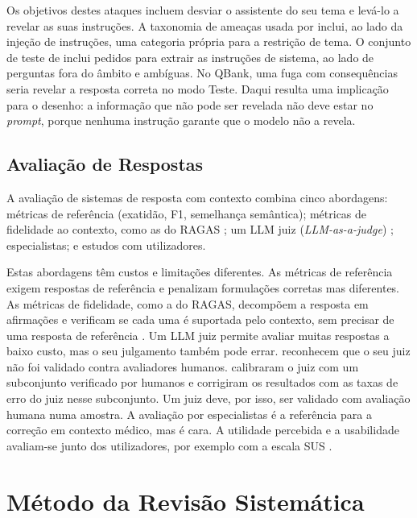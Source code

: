 Os objetivos destes ataques incluem desviar o assistente do seu tema e levá-lo a revelar as suas instruções. A taxonomia de ameaças usada por \textcite{walczak2026comparative} inclui, ao lado da injeção de instruções, uma categoria própria para a restrição de tema. O conjunto de teste de \textcite{buti2026evaluating} inclui pedidos para extrair as instruções de sistema, ao lado de perguntas fora do âmbito e ambíguas. No QBank, uma fuga com consequências seria revelar a resposta correta no modo Teste. Daqui resulta uma implicação para o desenho: a informação que não pode ser revelada não deve estar no \emph{prompt}, porque nenhuma instrução garante que o modelo não a revela.

\subsection{Avaliação de Respostas}
\label{sec:chap2_evaluation}

A avaliação de sistemas de resposta com contexto combina cinco abordagens: métricas de referência (exatidão, F1, semelhança semântica); métricas de fidelidade ao contexto, como as do \gls{RAGAS} \parencite{christiawan2025sanity,nurfadhilah2025retrieval}; um \gls{LLM} juiz (\emph{LLM-as-a-judge}) \parencite{buti2026evaluating,bellard2025development}; especialistas; e estudos com utilizadores.

Estas abordagens têm custos e limitações diferentes. As métricas de referência exigem respostas de referência e penalizam formulações corretas mas diferentes. As métricas de fidelidade, como a do \gls{RAGAS}, decompõem a resposta em afirmações e verificam se cada uma é suportada pelo contexto, sem precisar de uma resposta de referência \parencite{nurfadhilah2025retrieval}. Um \gls{LLM} juiz permite avaliar muitas respostas a baixo custo, mas o seu julgamento também pode errar. \textcite{buti2026evaluating} reconhecem que o seu juiz não foi validado contra avaliadores humanos. \textcite{liao2026heal} calibraram o juiz com um subconjunto verificado por humanos e corrigiram os resultados com as taxas de erro do juiz nesse subconjunto. Um juiz deve, por isso, ser validado com avaliação humana numa amostra. A avaliação por especialistas é a referência para a correção em contexto médico, mas é cara. A utilidade percebida e a usabilidade avaliam-se junto dos utilizadores, por exemplo com a escala \gls{SUS} \parencite{brooke1996sus}.

\section{Método da Revisão Sistemática}
\label{sec:chap2_protocol}

